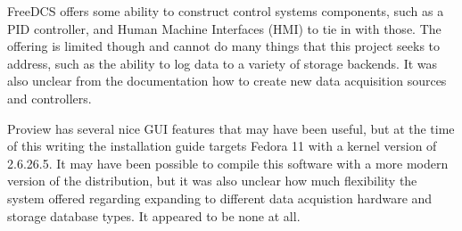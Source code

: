     FreeDCS offers some ability to construct control systems components, such
    as a PID controller, and Human Machine Interfaces (HMI) to tie in with
    those.  The offering is limited though and cannot do many things that this
    project seeks to address, such as the ability to log data to a variety of
    storage backends. It was also unclear from the documentation how to create
    new data acquisition sources and controllers.

    Proview has several nice GUI features that may have been useful, but at the
    time of this writing the installation guide targets Fedora 11 with a kernel
    version of 2.6.26.5. It may have been possible to compile this software
    with a more modern version of the distribution, but it was also unclear how
    much flexibility the system offered regarding expanding to different data
    acquistion hardware and storage database types. It appeared to be none at
    all.
